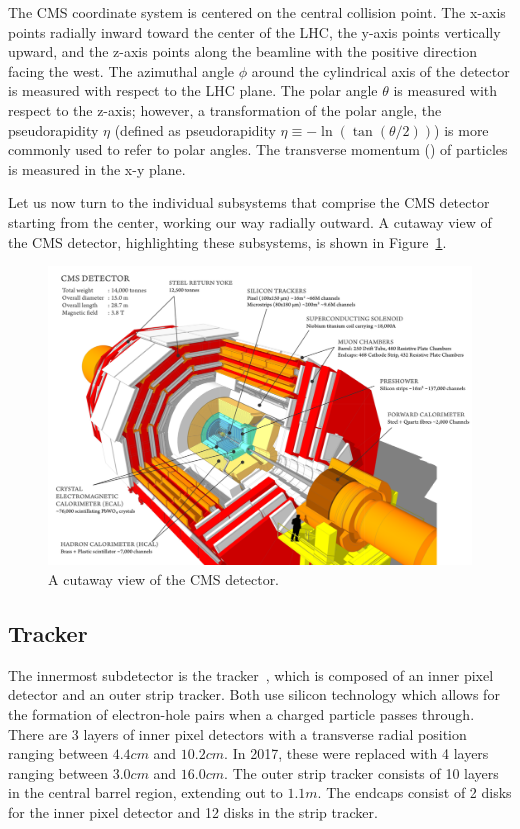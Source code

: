 The CMS coordinate system is centered on the central collision point.
The x-axis points radially inward toward the center of the LHC,
the y-axis points vertically upward, and the z-axis points along the beamline
with the positive direction facing the west. The azimuthal angle $\phi$
around the cylindrical axis of the detector
is measured with respect to the LHC plane. The polar angle $\theta$
is measured with respect to the z-axis; however, a 
transformation of the polar angle, the pseudorapidity $\eta$ (defined as
pseudorapidity $\eta \equiv -\ln (\tan (\theta/2))$) is more commonly used
to refer to polar angles. The transverse momentum (\pt) of particles 
is measured in the x-y plane.

Let us now turn to the individual subsystems that comprise the CMS detector
starting from the center, working our way radially outward. A cutaway view of
the CMS detector, highlighting these subsystems, is shown in
Figure~\ref{fig:cmsdetector}.

\begin{figure}[!htbp]
    \centering
    \includegraphics[width=0.99\linewidth]{figs/misc/cms.png}
    \caption{
        A cutaway view of the CMS detector.
    }
    \label{fig:cmsdetector}
\end{figure}

\FloatBarrier

\subsection{Tracker}

The innermost subdetector is the
tracker~\cite{CMS:TRK11001,CMS:Dominguez1481838}, which is composed of an
inner pixel detector and an outer strip tracker. Both use silicon technology
which allows for the formation of electron-hole pairs when a charged particle
passes through.
There are 3 layers of inner
pixel detectors with a transverse radial position ranging between $4.4\unit{cm}$ and $10.2\unit{cm}$. In 2017,
these were replaced with 4 layers ranging between $3.0\unit{cm}$ and $16.0\unit{cm}$.
The outer strip tracker consists of 10 layers in the central barrel region, extending
out to $1.1\unit{m}$. The endcaps consist of 2 disks for the inner pixel detector
and 12 disks in the strip tracker.

